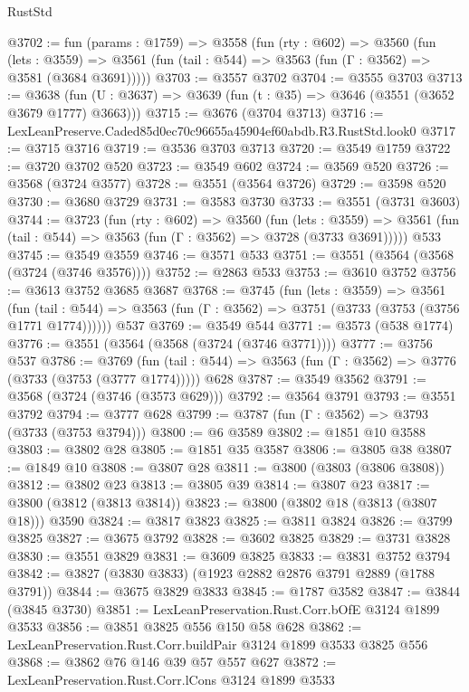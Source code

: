 \begin{lexlean}{RustStd}
\begin{coremodule}
@3702 := fun (params : @1759) =>
  @3558
    (fun (rty : @602) =>
    @3560
      (fun (lets : @3559) =>
      @3561 (fun (tail : @544) => @3563 (fun (Γ : @3562) => @3581 (@3684 @3691)))))
@3703 := @3557 @3702
@3704 := @3555 @3703
@3713 := @3638 (fun (U : @3637) => @3639 (fun (t : @35) => @3646 (@3551 (@3652 @3679 @1777) @3663)))
@3715 := @3676 (@3704 @3713)
@3716 := LexLeanPreserve.Caded85d0ec70c96655a45904ef60abdb.R3.RustStd.look0
@3717 := @3715 @3716
@3719 := @3536 @3703 @3713
@3720 := @3549 @1759
@3722 := @3720 @3702 @520
@3723 := @3549 @602
@3724 := @3569 @520
@3726 := @3568 (@3724 @3577)
@3728 := @3551 (@3564 @3726)
@3729 := @3598 @520
@3730 := @3680 @3729
@3731 := @3583 @3730
@3733 := @3551 (@3731 @3603)
@3744 := @3723
    (fun (rty : @602) =>
    @3560
      (fun (lets : @3559) =>
      @3561 (fun (tail : @544) => @3563 (fun (Γ : @3562) => @3728 (@3733 @3691)))))
    @533
@3745 := @3549 @3559
@3746 := @3571 @533
@3751 := @3551 (@3564 (@3568 (@3724 (@3746 @3576))))
@3752 := @2863 @533
@3753 := @3610 @3752
@3756 := @3613 @3752 @3685 @3687
@3768 := @3745
    (fun (lets : @3559) =>
    @3561
      (fun (tail : @544) => @3563 (fun (Γ : @3562) => @3751 (@3733 (@3753 (@3756 @1771 @1774))))))
    @537
@3769 := @3549 @544
@3771 := @3573 (@538 @1774)
@3776 := @3551 (@3564 (@3568 (@3724 (@3746 @3771))))
@3777 := @3756 @537
@3786 := @3769
    (fun (tail : @544) => @3563 (fun (Γ : @3562) => @3776 (@3733 (@3753 (@3777 @1774)))))
    @628
@3787 := @3549 @3562
@3791 := @3568 (@3724 (@3746 (@3573 @629)))
@3792 := @3564 @3791
@3793 := @3551 @3792
@3794 := @3777 @628
@3799 := @3787 (fun (Γ : @3562) => @3793 (@3733 (@3753 @3794)))
@3800 := @6 @3589
@3802 := @1851 @10 @3588
@3803 := @3802 @28
@3805 := @1851 @35 @3587
@3806 := @3805 @38
@3807 := @1849 @10
@3808 := @3807 @28
@3811 := @3800 (@3803 (@3806 @3808))
@3812 := @3802 @23
@3813 := @3805 @39
@3814 := @3807 @23
@3817 := @3800 (@3812 (@3813 @3814))
@3823 := @3800 (@3802 @18 (@3813 (@3807 @18))) @3590
@3824 := @3817 @3823
@3825 := @3811 @3824
@3826 := @3799 @3825
@3827 := @3675 @3792
@3828 := @3602 @3825
@3829 := @3731 @3828
@3830 := @3551 @3829
@3831 := @3609 @3825
@3833 := @3831 @3752 @3794
@3842 := @3827 (@3830 @3833) (@1923 @2882 @2876 @3791 @2889 (@1788 @3791))
@3844 := @3675 @3829 @3833
@3845 := @1787 @3582
@3847 := @3844 (@3845 @3730)
@3851 := LexLeanPreservation.Rust.Corr.bOfE @3124 @1899 @3533
@3856 := @3851 @3825 @556 @150 @58 @628
@3862 := LexLeanPreservation.Rust.Corr.buildPair @3124 @1899 @3533 @3825 @556
@3868 := @3862 @76 @146 @39 @57 @557 @627
@3872 := LexLeanPreservation.Rust.Corr.lCons @3124 @1899 @3533

\end{coremodule}
\end{lexlean}
